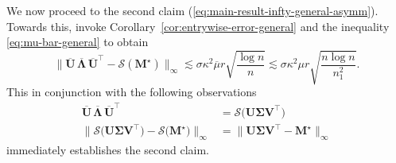 We now proceed to the second claim (\ref{eq:main-result-infty-general-asymm}).
Towards this, invoke Corollary~\ref{cor:entrywise-error-general} and the inequality \eqref{eq:mu-bar-general} to obtain 
\[
	\big\|\overline{\bm{U}}\,\overline{\bm{\Lambda}}\,\overline{\bm{U}}^{\top}-\mathcal{S}(\bm{M}^{\star}) \big\|_{\infty}\lesssim\sigma\kappa^{2}\overline{\mu}r\sqrt{\frac{\log n}{n}}
	\lesssim \sigma\kappa^{2}\mu r\sqrt{\frac{n\log n}{n_{1}^{2}}}. 
\]
This in conjunction with the following observations 
%
\begin{align*}
	\overline{\bm{U}}\,\overline{\bm{\Lambda}}\,\overline{\bm{U}}^{\top} & =\mathcal{S}\big(\bm{U}\bm{\Sigma}\bm{V}^{\top} \big) \\
	\big\|\mathcal{S} \big(\bm{U}\bm{\Sigma}\bm{V}^{\top}\big)- \mathcal{S}\big(\bm{M}^{\star}\big) \big\|_{\infty} &=  \big\|\bm{U}\bm{\Sigma}\bm{V}^{\top}-\bm{M}^{\star} \big\|_{\infty}
\end{align*}
%
immediately establishes the second claim.

